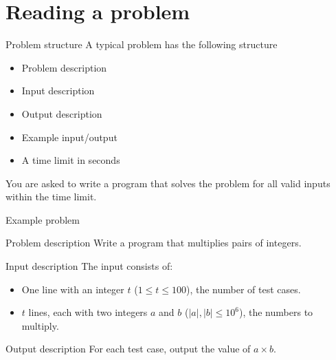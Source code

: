 \documentclass[11pt,pdf, aspectratio=169]{beamer}
\begin{document}
  \section{Reading a problem}
  \begin{frame}{Problem structure}
    A typical problem has the following structure
    \begin{itemize}
      \item Problem description
      \item Input description
      \item Output description
      \item Example input/output
      \item A time limit in seconds
    \end{itemize}
    You are asked to write a program that solves the problem for all valid inputs within the time limit.
  \end{frame}
  \begin{frame}{Example problem}
    \begin{block}{Problem description}
      Write a program that multiplies pairs of integers.
    \end{block}
    \vspace{10pt}
    \begin{block}{Input description}
      The input consists of:
      \begin{itemize}
        \item One line with an integer $t$ ($1\leq t\leq 100$), the number of test cases.
        \item $t$ lines, each with two integers $a$ and $b$ ($|a|,|b| \leq 10^6$), the numbers to multiply.
      \end{itemize}
    \end{block}

    \vspace{10pt}

    \begin{block}{Output description}
      For each test case, output the value of $a\times b$.
    \end{block}
  \end{frame}
\end{document}
